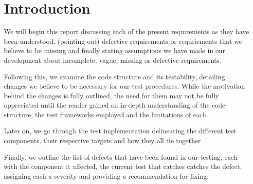 \section*{Introduction}

We will begin this report discussing each of the present requirements as they have been understood, (pointing out) defective requirements or requriements that we believe to be missing and finally stating assumptions we have made in our development about incomplete, vague, missing or defective requirements. 
\par

Following this, we examine the code structure and its testability, detailing changes we believe to be necessary for our test procedures. 
While the motivation behind the changes is fully outlined, the need for them may not be fully appreciated until the reader gained an in-depth understanding of the code-structure, the test frameworks employed and the limitations of each. 
\par

Later on, we go through the test implementation delineating the different test components, their respective targets and how they all tie together
\par

Finally, we outline the list of defects that have been found in our testing, each with the component it affected, the current test that catches catches the defect, assigning each a severity and providing a recommendation for fixing.   
